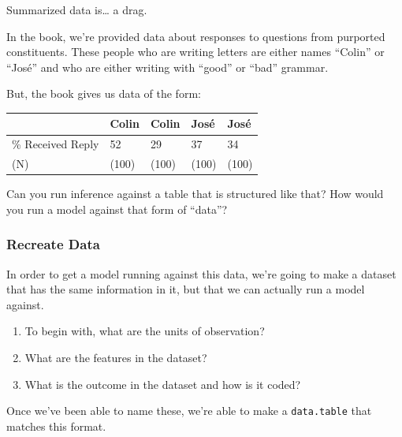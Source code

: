 \documentclass[
]{article}
\providecommand{\tightlist}{%
  \setlength{\itemsep}{0pt}\setlength{\parskip}{0pt}}
\theoremstyle{definition}
\theoremstyle{definition}
\theoremstyle{definition}
\theoremstyle{definition}
\theoremstyle{remark}
\begin{document}
Summarized data is\ldots{} a drag.

In the book, we're provided data about responses to questions from purported constituents. These people who are writing letters are either names ``Colin'' or ``José'' and who are either writing with ``good'' or ``bad'' grammar.

But, the book gives us data of the form:

\begin{longtable}[]{@{}lllll@{}}
\toprule\noalign{}
& Colin & Colin & José & José \\
\midrule\noalign{}
\endhead
\bottomrule\noalign{}
\endlastfoot
\% Received Reply & 52 & 29 & 37 & 34 \\
(N) & (100) & (100) & (100) & (100) \\
\end{longtable}

Can you run inference against a table that is structured like that? How would you run a model against that form of ``data''?

\subsubsection{Recreate Data}\label{recreate-data}

In order to get a model running against this data, we're going to make a dataset that has the same information in it, but that we can actually run a model against.

\begin{enumerate}
\def\labelenumi{\arabic{enumi}.}
\tightlist
\item
  To begin with, what are the units of observation?
\item
  What are the features in the dataset?
\item
  What is the outcome in the dataset and how is it coded?
\end{enumerate}

Once we've been able to name these, we're able to make a \texttt{data.table} that matches this format.
\end{document}
